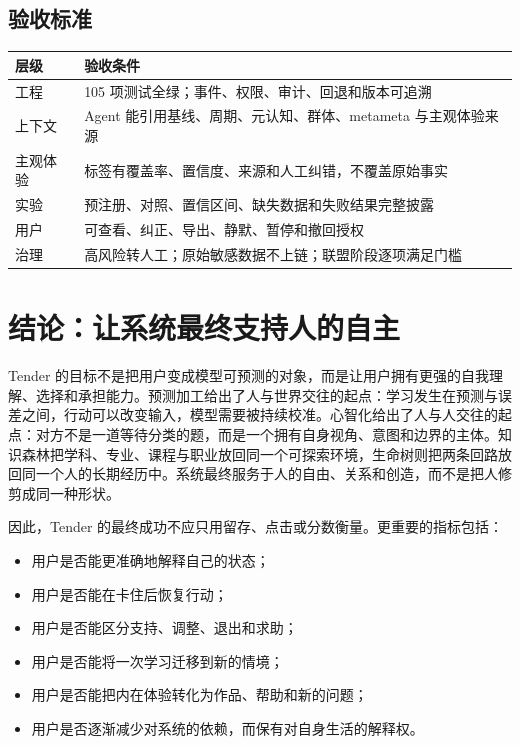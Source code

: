 \documentclass[UTF8,a4paper,11pt]{ctexart}
\begin{document}
\subsection{验收标准}

\begin{center}
\begin{longtable}{@{}p{4.3cm}p{8.5cm}@{}}
\toprule
\textbf{层级} & \textbf{验收条件} \\
\midrule
工程 & 105 项测试全绿；事件、权限、审计、回退和版本可追溯 \\
上下文 & Agent 能引用基线、周期、元认知、群体、metameta 与主观体验来源 \\
主观体验 & 标签有覆盖率、置信度、来源和人工纠错，不覆盖原始事实 \\
实验 & 预注册、对照、置信区间、缺失数据和失败结果完整披露 \\
用户 & 可查看、纠正、导出、静默、暂停和撤回授权 \\
治理 & 高风险转人工；原始敏感数据不上链；联盟阶段逐项满足门槛 \\
\bottomrule
\end{longtable}
\end{center}

\newpage
\section{结论：让系统最终支持人的自主}

Tender 的目标不是把用户变成模型可预测的对象，而是让用户拥有更强的自我理解、选择和承担能力。预测加工给出了人与世界交往的起点：学习发生在预测与误差之间，行动可以改变输入，模型需要被持续校准。心智化给出了人与人交往的起点：对方不是一道等待分类的题，而是一个拥有自身视角、意图和边界的主体。知识森林把学科、专业、课程与职业放回同一个可探索环境，生命树则把两条回路放回同一个人的长期经历中。系统最终服务于人的自由、关系和创造，而不是把人修剪成同一种形状。

因此，Tender 的最终成功不应只用留存、点击或分数衡量。更重要的指标包括：

\begin{itemize}
\item 用户是否能更准确地解释自己的状态；
\item 用户是否能在卡住后恢复行动；
\item 用户是否能区分支持、调整、退出和求助；
\item 用户是否能将一次学习迁移到新的情境；
\item 用户是否能把内在体验转化为作品、帮助和新的问题；
\item 用户是否逐渐减少对系统的依赖，而保有对自身生活的解释权。
\end{itemize}
\end{document}
